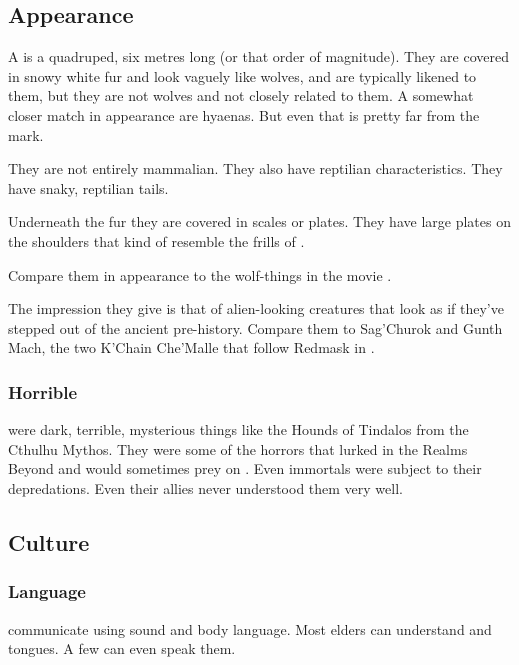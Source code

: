\subsection{Appearance}
A \vorcanth{} is a quadruped, six metres long (or that order of magnitude). 
They are covered in snowy white fur and look vaguely like wolves, and are typically likened to them, but they are not wolves and not closely related to them. 
A somewhat closer match in appearance are hyaenas. 
But even that is pretty far from the mark.

They are not entirely mammalian. 
They also have reptilian characteristics. 
They have snaky, reptilian tails. 

Underneath the fur they are covered in \armoured scales or plates. 
They have large \armour plates on the shoulders that kind of resemble the frills of \mulgrons. 

Compare them in appearance to the wolf-things in the movie . 

The impression they give is that of alien-looking creatures that look as if they've stepped out of the ancient pre-history. 
Compare them to Sag'Churok and Gunth Mach, the two K'Chain Che'Malle that follow Redmask in \MalazanReapersGale.





\subsubsection{Horrible}
\Vorcanths were dark, terrible, mysterious things like the Hounds of Tindalos from the Cthulhu Mythos. 
They were some of the horrors that lurked in the Realms Beyond and would sometimes prey on \Miithians. 
Even immortals were subject to their depredations. 
Even their \resphan allies never understood them very well. 









\subsection{Culture}





\subsubsection{Language}
\Vorcanths{} communicate using sound and body language. 
Most elders can understand \draconic{} and \resphan{} tongues. 
A few can even speak them. 

